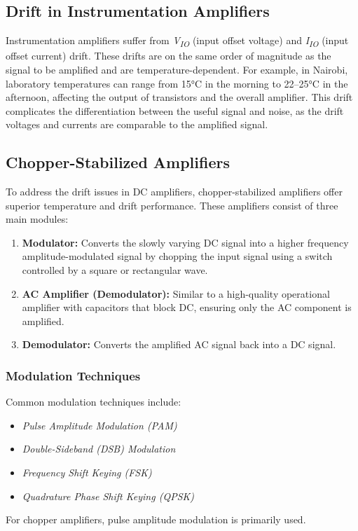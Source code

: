 \documentclass[a4paper,9pt,twoside,openany,twocolumn]{memoir}
\begin{document}
\subsection{Drift in Instrumentation Amplifiers}
Instrumentation amplifiers suffer from \textit{V\textsubscript{IO}} (input offset voltage) and \textit{I\textsubscript{IO}} (input offset current) drift. These drifts are on the same order of magnitude as the signal to be amplified and are temperature-dependent. For example, in Nairobi, laboratory temperatures can range from 15°C in the morning to 22–25°C in the afternoon, affecting the output of transistors and the overall amplifier. This drift complicates the differentiation between the useful signal and noise, as the drift voltages and currents are comparable to the amplified signal.

\subsection{Chopper-Stabilized Amplifiers}
To address the drift issues in DC amplifiers, chopper-stabilized amplifiers offer superior temperature and drift performance. These amplifiers consist of three main modules:
\begin{enumerate}
    \item \textbf{Modulator:} Converts the slowly varying DC signal into a higher frequency amplitude-modulated signal by chopping the input signal using a switch controlled by a square or rectangular wave.
    \item \textbf{AC Amplifier (Demodulator):} Similar to a high-quality operational amplifier with capacitors that block DC, ensuring only the AC component is amplified.
    \item \textbf{Demodulator:} Converts the amplified AC signal back into a DC signal.
\end{enumerate}

\subsubsection{Modulation Techniques}
Common modulation techniques include:
\begin{itemize}
    \item \textit{Pulse Amplitude Modulation (PAM)}
    \item \textit{Double-Sideband (DSB) Modulation}
    \item \textit{Frequency Shift Keying (FSK)}
    \item \textit{Quadrature Phase Shift Keying (QPSK)}
\end{itemize}
For chopper amplifiers, pulse amplitude modulation is primarily used.
\end{document}
